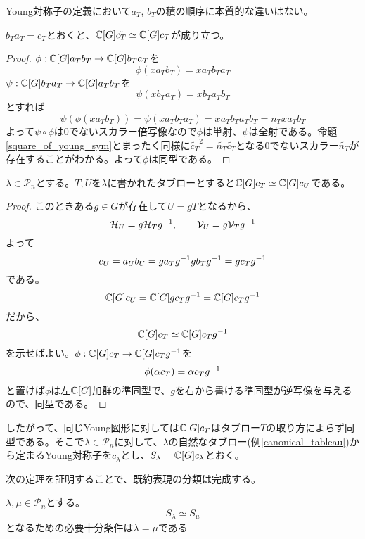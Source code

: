 \documentclass{ltjsreport}
\begin{document}
Young対称子の定義において$a_T$, $b_T$の積の順序に本質的な違いはない。

\begin{prop}\label{reverse_young_sym}
  $b_T a_T=\tilde{c_T}$とおくと、$\mathbb{C}[G]\tilde{c_T}\simeq \mathbb{C}[G]c_T$が成り立つ。
\end{prop}

\begin{proof}
  $\phi:\mathbb{C}[G]a_Tb_T\rightarrow\mathbb{C}[G]b_Ta_T$を
  \[
  \phi(xa_Tb_T)=xa_Tb_Ta_T  
  \]
  $\psi:\mathbb{C}[G]b_Ta_T\rightarrow\mathbb{C}[G]a_Tb_T$を
  \[
  \psi(xb_Ta_T)=xb_Ta_Tb_T  
  \]
  とすれば
  \[
  \psi(\phi(xa_Tb_T))=\psi(xa_Tb_Ta_T)=xa_Tb_Ta_Tb_T=n_Txa_Tb_T  
  \]
  よって$\psi\circ\phi$は0でないスカラー倍写像なので$\phi$は単射、$\psi$は全射である。命題\ref{square_of_young_sym}とまったく同様に$\tilde{c_T}^2=\tilde{n_T}\tilde{c_T}$となる0でないスカラー$\tilde{n_T}$が存在することがわかる。よって$\phi$は同型である。
\end{proof}


\begin{prop}
  $\lambda\in\mathcal{P}_n$とする。$T,U$を$\lambda$に書かれたタブローとすると$\mathbb{C}[G]c_T\simeq \mathbb{C}[G]c_U$である。
\end{prop}

\begin{proof}
  このときある$g\in G$が存在して$U=gT$となるから、
  \[
  \mathcal{H}_U=g\mathcal{H}_Tg^{-1},\qquad \mathcal{V}_U=g\mathcal{V}_Tg^{-1}  
  \]
  よって
  \[
  c_U=a_Ub_U=ga_Tg^{-1}gb_Tg^{-1}=gc_Tg^{-1}  
  \]
  である。
  \[
  \mathbb{C}[G]c_U=\mathbb{C}[G]gc_Tg^{-1}=\mathbb{C}[G]c_Tg^{-1}  
  \]
  だから、
  \[
  \mathbb{C}[G]c_T\simeq \mathbb{C}[G]c_Tg^{-1}  
  \]
  を示せばよい。$\phi:\mathbb{C}[G]c_T\rightarrow\mathbb{C}[G]c_Tg^{-1}$を
  \[
  \phi(\alpha c_T)=\alpha c_Tg^{-1}  
  \]
  と置けば$\phi$は左$\mathbb{C}[G]$加群の準同型で、$g$を右から書ける準同型が逆写像を与えるので、同型である。
\end{proof}


したがって、同じYoung図形に対しては$\mathbb{C}[G]c_T$はタブロー$T$の取り方によらず同型である。そこで$\lambda\in\mathcal{P}_n$に対して、$\lambda$の自然なタブロー(例\ref{canonical_tableau})から定まるYoung対称子を$c_\lambda$とし、$S_\lambda=\mathbb{C}[G]c_\lambda$とおく。





次の定理を証明することで、既約表現の分類は完成する。

\begin{theo}\label{young_and_irr_rep}
  $\lambda,\mu\in\mathcal{P}_n$とする。
  \[
  S_\lambda\simeq S_\mu 
  \]
  となるための必要十分条件は$\lambda=\mu$である
\end{theo}
\end{document}
